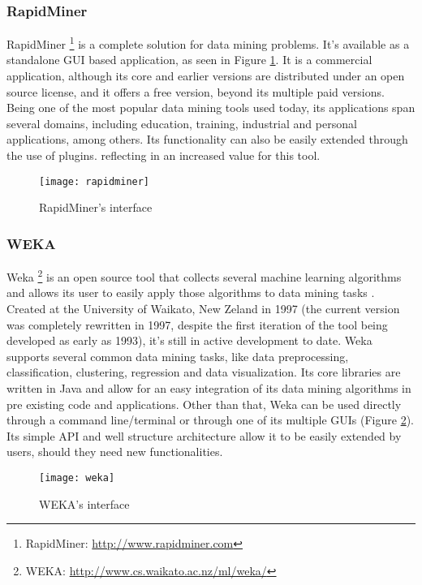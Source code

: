 \subsubsection{RapidMiner}
RapidMiner \footnote{RapidMiner: \url{http://www.rapidminer.com}} is a complete solution for data mining problems. It’s available as a standalone GUI based application, as seen in Figure \ref{fig:rapidminer}. It is a commercial application, although its core and earlier versions are distributed under an open source license, and it offers a free version, beyond its multiple paid versions. Being one of the most popular data mining tools used today, its applications span several domains, including education, training, industrial and personal applications, among others. Its functionality can also be easily extended through the use of plugins. reflecting in an increased value for this tool.

\begin{figure}[htb]
  \begin{center}
    \leavevmode
    \texttt{[image: rapidminer]}
	\caption{RapidMiner's interface}
    \label{fig:rapidminer}
  \end{center}
\end{figure}

\subsubsection{WEKA}
Weka \footnote{WEKA: \url{http://www.cs.waikato.ac.nz/ml/weka/}} is an open source tool that collects several machine learning algorithms and allows its user to easily apply those algorithms to data mining tasks \cite{han2006data}. Created at the University of Waikato, New Zeland in 1997 (the current version was completely rewritten in 1997, despite the first iteration of the tool being developed as early as 1993), it's still in active development to date. Weka supports several common data mining tasks, like data preprocessing, classification, clustering, regression and data visualization. Its core libraries are written in Java and allow for an easy integration of its data mining algorithms in pre existing code and applications. Other than that, Weka can be used directly through a command line/terminal or through one of its multiple GUIs (Figure \ref{fig:weka}). Its simple API and well structure architecture allow it to be easily extended by users, should they need new functionalities.

\begin{figure}[htb]
  \begin{center}
    \leavevmode
    \texttt{[image: weka]}
	\caption{WEKA's interface}
    \label{fig:weka}
  \end{center}
\end{figure}

